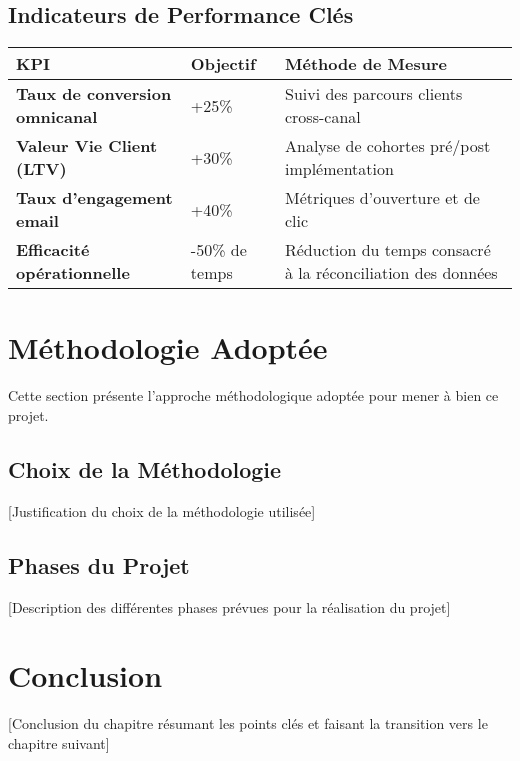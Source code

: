 \subsection{Indicateurs de Performance Clés}
\begin{center}
\begin{tabular}{|>{
\bfseries}p{5cm}|p{3cm}|p{5cm}|}
\hline
\rowcolor{lightblue} KPI & Objectif & Méthode de Mesure \\
\hline
Taux de conversion omnicanal & +25\% & Suivi des parcours clients cross-canal \\
\hline
Valeur Vie Client (LTV) & +30\% & Analyse de cohortes pré/post implémentation \\
\hline
Taux d'engagement email & +40\% & Métriques d'ouverture et de clic \\
\hline
Efficacité opérationnelle & -50\% de temps & Réduction du temps consacré à la réconciliation des données \\
\hline
\end{tabular}
\end{center}

\section{Méthodologie Adoptée}
Cette section présente l'approche méthodologique adoptée pour mener à bien ce projet.

\subsection{Choix de la Méthodologie}
[Justification du choix de la méthodologie utilisée]

\subsection{Phases du Projet}
[Description des différentes phases prévues pour la réalisation du projet]

\section{Conclusion}
[Conclusion du chapitre résumant les points clés et faisant la transition vers le chapitre suivant]

